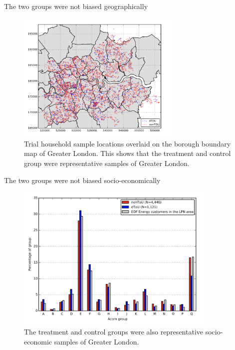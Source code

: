 \documentclass{beamer}
\begin{document}
\begin{frame}{The two groups were not biased geographically}
  \begin{figure}
    \centering
      \includegraphics[width=0.7\textwidth]{images/london-geo-breakdown.png}
      \caption{Trial household sample locations overlaid on the borough boundary map of Greater London. This shows that the treatment and control group were representative samples of Greater London.}
  \end{figure}
\end{frame}

\begin{frame}{The two groups were not biased socio-economically}
  \begin{figure}
    \centering
    \includegraphics[width=0.85\textwidth]{images/london-socio-breakdown.png}
    \caption{The treatment and control groups were also representative socio-economic samples of Greater London.}
  \end{figure}
\end{frame}
\end{document}
